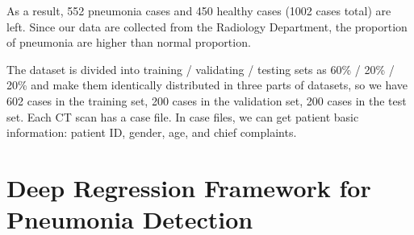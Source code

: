 \documentclass[journal]{IEEEtran}
\begin{document}
As a result, 552 pneumonia cases and 450 healthy cases (1002 cases total) are left. Since our data are collected from the Radiology Department, the proportion of pneumonia are higher than normal proportion.

The dataset is divided into training / validating / testing sets as 60\% / 20\% / 20\% and make them identically distributed in three parts of datasets, so we have 602 cases in the training set, 200 cases in the validation set, 200 cases in the test set.
Each CT scan has a case file. In case files, we can get patient basic information: patient ID, gender, age, and chief complaints. 

\section{Deep Regression Framework for Pneumonia Detection}
\label{framework}
\end{document}

